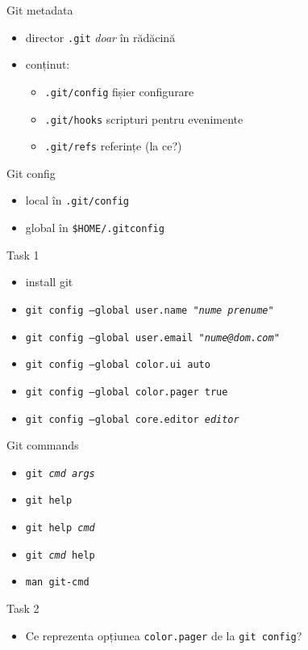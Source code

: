 \documentclass{beamer}
\begin{document}
\begin{frame}{Git metadata}
  \begin{itemize}[<+->]
    \item director \texttt{.git} \textit{doar} în rădăcină
    \item conținut:
      \begin{itemize}
        \item \texttt{.git/config} fișier configurare
        \item \texttt{.git/hooks} scripturi pentru evenimente
        \item \texttt{.git/refs} referințe (la ce?)
      \end{itemize}
  \end{itemize}
\end{frame}

\begin{frame}{Git config}
  \begin{itemize}
    \item local în \texttt{.git/config}
    \item global în \texttt{\$HOME/.gitconfig}
  \end{itemize}
  \pause
  \begin{alertblock}{Task 1}
    \begin{itemize}
      \item install git
      \item \texttt{git config --global user.name "\textit{nume prenume}"}
      \item \texttt{git config --global user.email "\textit{nume@dom.com}"}
      \item \texttt{git config --global color.ui auto}
      \item \texttt{git config --global color.pager true}
      \item \texttt{git config --global core.editor \textit{editor}}
    \end{itemize}
  \end{alertblock}
\end{frame}

\begin{frame}{Git commands}
  \begin{itemize}
    \item \texttt{git \textit{cmd args}}
    \item \texttt{git help}
    \item \texttt{git help \textit{cmd}}
    \item \texttt{git \textit{cmd} help}
    \item \texttt{man git-\texttt{cmd}}
  \end{itemize}
  \begin{alertblock}{Task 2}
    \begin{itemize}
      \item Ce reprezenta opțiunea \texttt{color.pager} de la \texttt{git config}?
    \end{itemize}
  \end{alertblock}
\end{frame}
\end{document}
